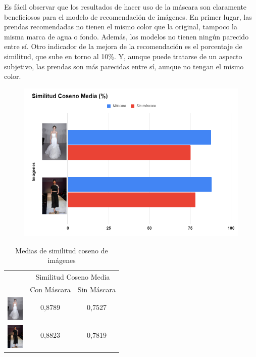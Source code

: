 \documentclass[12pt]{report} %
\begin{document}
	Es fácil observar que los resultados de hacer uso de la máscara son claramente beneficiosos para el modelo de recomendación de imágenes.
	En primer lugar, las prendas recomendadas no tienen el mismo color que la original, tampoco la misma marca de agua o fondo. Además, los modelos
	no tienen ningún parecido entre sí. Otro indicador de la mejora de la recomendación es el porcentaje de similitud, que sube en torno al 10\%.
	Y, aunque puede tratarse de un aspecto subjetivo, las prendas son más parecidas entre sí, aunque no tengan el mismo color.

	\begin{figure}[H]
		{\includegraphics[scale=0.9]{grafica-similitud.png}}
	\end{figure}

	\begin{table}[H]
    \centering
    \caption{Medias de similitud coseno de imágenes}
    \begin{tabular}{lcc}
        & \multicolumn{2}{c}{Similitud Coseno Media} \\
        \cmidrule{2-3}
        & Con Máscara & Sin Máscara \\
        \midrule
        \multirow{2}{*}{\includegraphics[width=0.8cm]{miniatura2.jpg}} & 0,8789 & 0,7527 \\
        &  &  \\
        \midrule
        \multirow{2}{*}{\includegraphics[width=0.8cm]{miniatura1.jpg}} & 0,8823 & 0,7819 \\
        &  &  \\
        \bottomrule
    \end{tabular}
	\end{table}
\end{document}
